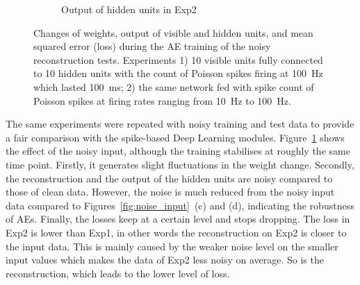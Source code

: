 \begin{figure}
\begin{subfigure}[t]{0.48\textwidth}
		\caption{Output of hidden units in Exp2}
	\end{subfigure}
	\caption[AE training of the reconstruction tests given noisy data.]{Changes of weights, output of visible and hidden units, and mean squared error (loss) during the AE training of the noisy reconstruction tests. 
		Experiments 1) 10 visible units fully connected to 10 hidden units with the count of Poisson spikes firing at 100~Hz which lasted 100~ms; 2) the same network fed with spike count of Poisson spikes at firing rates ranging from 10~Hz to 100~Hz.}
	\label{fig:ae_noise}
\end{figure}

The same experiments were repeated with noisy training and test data to provide a fair comparison with the spike-based Deep Learning modules.
Figure~\ref{fig:ae_noise} shows the effect of the noisy input, although the training stabilises at roughly the same time point.
Firstly, it generates slight fluctuations in the weight change.
Secondly, the reconstruction and the output of the hidden units are noisy compared to those of clean data.
However, the noise is much reduced from the noisy input data compared to Figures~\ref{fig:noise_input}~(c) and (d), indicating the robustness of AEs. 
Finally, the losses keep at a certain level and stops dropping.
The loss in Exp2 is lower than Exp1, in other words the reconstruction on Exp2 is closer to the input data.
This is mainly caused by the weaker noise level on the smaller input values which makes the data of Exp2 less noisy on average.
So is the reconstruction, which leads to the lower level of loss.
